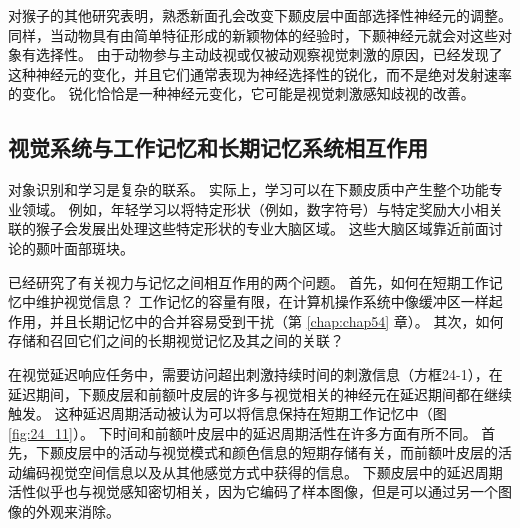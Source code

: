 对猴子的其他研究表明，熟悉新面孔会改变下颞皮层中面部选择性神经元的调整。
同样，当动物具有由简单特征形成的新颖物体的经验时，下颞神经元就会对这些对象有选择性。
由于动物参与主动歧视或仅被动观察视觉刺激的原因，已经发现了这种神经元的变化，并且它们通常表现为神经选择性的锐化，而不是绝对发射速率的变化。
锐化恰恰是一种神经元变化，它可能是视觉刺激感知歧视的改善。


\subsection{视觉系统与工作记忆和长期记忆系统相互作用}
对象识别和学习是复杂的联系。
实际上，学习可以在下颞皮质中产生整个功能专业领域。 
例如，年轻学习以将特定形状（例如，数字符号）与特定奖励大小相关联的猴子会发展出处理这些特定形状的专业大脑区域。
这些大脑区域靠近前面讨论的颞叶面部斑块。


已经研究了有关视力与记忆之间相互作用的两个问题。 
首先，如何在短期工作记忆中维护视觉信息？
工作记忆的容量有限，在计算机操作系统中像缓冲区一样起作用，并且长期记忆中的合并容易受到干扰（第 \ref{chap:chap54} 章）。
其次，如何存储和召回它们之间的长期视觉记忆及其之间的关联？


在视觉延迟响应任务中，需要访问超出刺激持续时间的刺激信息（方框24-1），在延迟期间，下颞皮层和前额叶皮层的许多与视觉相关的神经元在延迟期间都在继续触发。
这种延迟周期活动被认为可以将信息保持在短期工作记忆中（图 \ref{fig:24_11}）。
下时间和前额叶皮层中的延迟周期活性在许多方面有所不同。
首先，下颞皮层中的活动与视觉模式和颜色信息的短期存储有关，而前额叶皮层的活动编码视觉空间信息以及从其他感觉方式中获得的信息。
下颞皮层中的延迟周期活性似乎也与视觉感知密切相关，因为它编码了样本图像，但是可以通过另一个图像的外观来消除。


